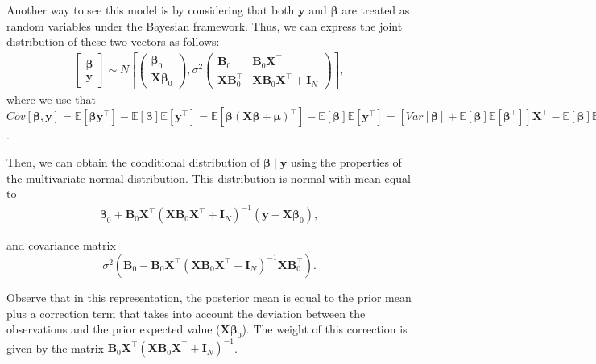 Another way to see this model is by considering that both \( \bm{y} \) and \( \bm{\beta} \) are treated as random variables under the Bayesian framework. Thus, we can express the joint distribution of these two vectors as follows:
\begin{align*}
	\begin{bmatrix}
		\bm{\beta}\\ 
		\bm{y}
	\end{bmatrix}\sim N\left [ \begin{pmatrix}
		\bm{\beta}_{0} \\
		\bm{X}\bm{\beta}_{0}
	\end{pmatrix} , \sigma^2\begin{pmatrix}
		\bm{B}_{0} & \bm{B}_{0} \bm{X}^{\top} \\ 
		\bm{X}\bm{B}_{0}^{\top} & \bm{X}\bm{B}_{0}\bm{X}^{\top}+\bm{I}_N
	\end{pmatrix}\right ],
\end{align*}
where we use that $Cov[\bm{\beta},\bm{y}]=\mathbb{E}[\bm{\beta}\bm{y}^{\top}]-\mathbb{E}[\bm{\beta}]\mathbb{E}[\bm{y}^{\top}]=\mathbb{E}[\bm{\beta}(\bm{X}\bm{\beta}+\bm{\mu})^{\top}]-\mathbb{E}[\bm{\beta}]\mathbb{E}[\bm{y}^{\top}]=[Var[\bm{\beta}]+\mathbb{E}[\bm{\beta}]\mathbb{E}[\bm{\beta}^{\top}]]\bm{X}^{\top}-\mathbb{E}[\bm{\beta}]\mathbb{E}[\bm{y}^{\top}]=\sigma^2\bm{B}_0\bm{X}^{\top}+\bm{\beta}_0\bm{\beta}_0^{\top}\bm{X}^{\top}-\bm{\beta}_0\bm{\beta}_0^{\top}\bm{X}^{\top}=\sigma^2\bm{B}_0\bm{X}^{\top}$.

Then, we can obtain the conditional distribution of \( \bm{\beta} \mid \bm{y} \) using the properties of the multivariate normal distribution. This distribution is normal with mean equal to
\begin{align}\label{eq:415}
\bm{\beta}_{0} + \bm{B}_{0} \bm{X}^{\top} \left( \bm{X} \bm{B}_{0} \bm{X}^{\top} + \bm{I}_N \right)^{-1} (\bm{y} - \bm{X} \bm{\beta}_{0}),
\end{align}

and covariance matrix
\[
\sigma^2 \left( \bm{B}_{0} - \bm{B}_{0} \bm{X}^{\top} \left( \bm{X} \bm{B}_{0} \bm{X}^{\top} + \bm{I}_N \right)^{-1} \bm{X} \bm{B}_{0}^{\top} \right).
\]

Observe that in this representation, the posterior mean is equal to the prior mean plus a correction term that takes into account the deviation between the observations and the prior expected value (\( \bm{X} \bm{\beta}_{0} \)). The weight of this correction is given by the matrix \( \bm{B}_{0} \bm{X}^{\top} \left( \bm{X} \bm{B}_{0} \bm{X}^{\top} + \bm{I}_N \right)^{-1} \).

